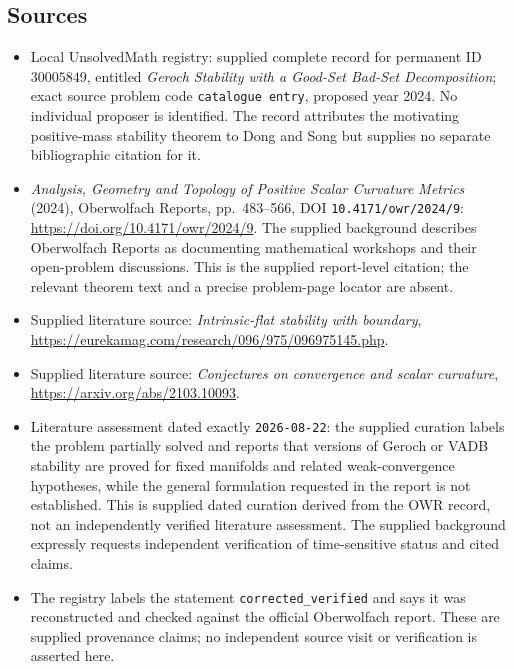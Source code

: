 \documentclass[11pt]{article}
\begin{document}
\subsection{Sources}
\begin{itemize}
\item Local UnsolvedMath registry: supplied complete record for permanent ID \(30005849\), entitled \emph{Geroch Stability with a Good-Set Bad-Set Decomposition}; exact source problem code \texttt{catalogue entry}, proposed year 2024. No individual proposer is identified. The record attributes the motivating positive-mass stability theorem to Dong and Song but supplies no separate bibliographic citation for it.
\item \emph{Analysis, Geometry and Topology of Positive Scalar Curvature Metrics} (2024), Oberwolfach Reports, pp.~483--566, DOI \texttt{10.4171/owr/2024/9}: \url{https://doi.org/10.4171/owr/2024/9}. The supplied background describes Oberwolfach Reports as documenting mathematical workshops and their open-problem discussions. This is the supplied report-level citation; the relevant theorem text and a precise problem-page locator are absent.
\item Supplied literature source: \emph{Intrinsic-flat stability with boundary}, \url{https://eurekamag.com/research/096/975/096975145.php}.
\item Supplied literature source: \emph{Conjectures on convergence and scalar curvature}, \url{https://arxiv.org/abs/2103.10093}.
\item Literature assessment dated exactly \texttt{2026-08-22}: the supplied curation labels the problem partially solved and reports that versions of Geroch or VADB stability are proved for fixed manifolds and related weak-convergence hypotheses, while the general formulation requested in the report is not established. This is supplied dated curation derived from the OWR record, not an independently verified literature assessment. The supplied background expressly requests independent verification of time-sensitive status and cited claims.
\item The registry labels the statement \texttt{corrected\_verified} and says it was reconstructed and checked against the official Oberwolfach report. These are supplied provenance claims; no independent source visit or verification is asserted here.
\end{itemize}
\end{document}
